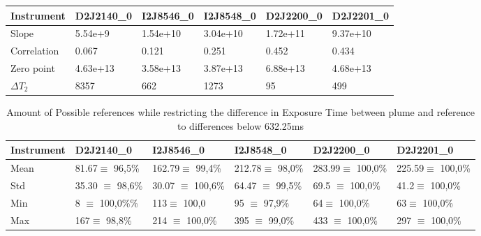 \begin{table}[h]
	\begin{tabular}{|p{2cm}|p{2cm}|p{2cm}|p{2cm}|p{2cm}|p{2cm}|}
		Instrument	&D2J2140\_0&I2J8546\_0& I2J8548\_0&D2J2200\_0&D2J2201\_0\\
		\toprule
		Slope& 5.54e+9&1.54e+10 &3.04e+10&1.72e+11&9.37e+10\\
		\midrule
		Correlation&0.067
		&0.121&
		0.251&
		0.452&
		0.434\\
		\midrule
		Zero point&4.63e+13&3.58e+13& 3.87e+13& 6.88e+13& 4.68e+13\\
		\midrule
		$\Delta T_{2}$&8357&662&1273&95&499\\
		\bottomrule
	\end{tabular}
	\label{tab:exptimecalc}
\end{table}

\begin{table}
	\begin{tabular}{|p{2cm}|p{2cm}|p{2cm}|p{2cm}|p{2cm}|p{2cm}|}
		Instrument	&D2J2140\_0&I2J8546\_0& I2J8548\_0&D2J2200\_0&D2J2201\_0\\
		\toprule
		Mean&
		81.67$\equiv$ 96,5\%		&162.79$\equiv$ 99,4\%		&212.78$\equiv$ 98,0\%		&283.99$\equiv$ 100,0\%		&225.59$\equiv$ 100,0\% \\
		\midrule
		Std&
		35.30 $\equiv$	98,6\%&		30.07 $\equiv$	100,6\%&
		64.47 $\equiv$	99,5\% &		69.5 $\equiv$	100,0\% &
		41.2$\equiv$	100,0\% \\
		\midrule
		Min  &
		8 $\equiv$	100,0\%\%&113$\equiv$	100,0
		&95 $\equiv$	97,9\%
		&64$\equiv$	100,0\%
		&63$\equiv$	100,0\%\\
		\midrule
		Max&
		167$\equiv$	98,8\% &
		214 $\equiv$	100,0\% &
		395 $\equiv$	99,0\% &
		433 $\equiv$	100,0\%  &
		297 $\equiv$	100,0\% \\
		\bottomrule
	\end{tabular}
	\caption{Amount of Possible references while restricting the difference in Exposure Time  between plume and reference to differences below 632.25ms}
	\label{tab:etrest}
\end{table}	







